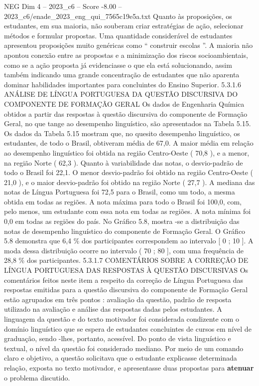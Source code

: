 \begin{textsample}{NEG Dim 4 – 2023\_c6 – Score -8.00 – 2023\_c6/enade\_2023\_eng\_qui\_7565c19e5a.txt}
Quanto às proposições, os estudantes, em sua maioria, não souberam criar estratégias de ação, selecionar métodos e formular propostas.
Uma quantidade considerável de estudantes apresentou proposições muito genéricas como “ construir escolas ”.
A maioria não apontou conexão entre as propostas e a minimização dos riscos socioambientais, como se a ação proposta já evidenciasse o que ela está solucionando, assim também indicando uma grande concentração de estudantes que não aparenta dominar habilidades importantes para concluintes do Ensino Superior. 5.3.1.6 ANÁLISE DE LÍNGUA PORTUGUESA DA QUESTÃO DISCURSIVA DO COMPONENTE DE FORMAÇÃO GERAL Os dados de Engenharia Química obtidos a partir das respostas à questão discursiva do componente de Formação Geral, no que tange ao desempenho linguístico, são apresentados na Tabela 5.15.
Os dados da Tabela 5.15 mostram que, no quesito desempenho linguístico, os estudantes, de todo o Brasil, obtiveram média de 67,0.
A maior média em relação ao desempenho linguístico foi obtida na região Centro-Oeste ( 70,8 ), e a menor, na região Norte ( 62,3 ).
Quanto à variabilidade das notas, o desvio-padrão de todo o Brasil foi 22,1.
O menor desvio-padrão foi obtido na região Centro-Oeste ( 21,0 ), e o maior desvio-padrão foi obtido na região Norte ( 27,7 ).
A mediana das notas de Língua Portuguesa foi 72,5 para o Brasil, como um todo, a mesma obtida em todas as regiões.
A nota máxima para todo o Brasil foi 100,0, com, pelo menos, um estudante com essa nota em todas as regiões.
A nota mínima foi 0,0 em todas as regiões do país.
No Gráfico 5.8, mostra -se a distribuição das notas de desempenho linguístico do componente de Formação Geral.
O Gráfico 5.8 demonstra que 6,4 \% dos participantes correspondem ao intervalo [ 0 ; 10 ].
A moda dessa distribuição ocorre no intervalo ( 70 ; 80 ], com uma frequência de 28,8 \% dos participantes. 5.3.1.7 COMENTÁRIOS SOBRE A CORREÇÃO DE LÍNGUA PORTUGUESA DAS RESPOSTAS À QUESTÃO DISCURSIVAS Os comentários feitos neste item a respeito da correção de Língua Portuguesa das respostas emitidas para a questão discursiva do componente de Formação Geral estão agrupados em três pontos : avaliação da questão, padrão de resposta utilizado na avaliação e análise das respostas dadas pelos estudantes.
A linguagem da questão e do texto motivador foi considerada condizente com o domínio linguístico que se espera de estudantes concluintes de cursos em nível de graduação, sendo -lhes, portanto, acessível.
Do ponto de vista linguístico e textual, o nível da questão foi considerado mediano.
Por meio de um comando claro e objetivo, a questão solicitava que o estudante explicasse determinada relação, exposta no texto motivador, e apresentasse duas propostas para \textbf{atenuar} o problema discutido.

\end{textsample}

